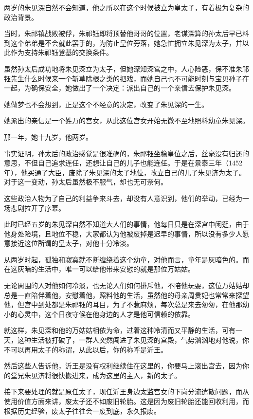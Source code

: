 \begin{multicols}{\theparacolNo}
两岁的朱见深自然不会知道，他之所以在这个时候被立为皇太子，有着极为复杂的政治背景。

当时，朱祁镇战败被俘，朱祁钰即将顶替他哥哥的位置，老谋深算的孙太后早已料到这个弟弟是不会就此罢手的，为防止皇位旁落，她急忙拥立朱见深为太子，并以此作为支持朱祁钰登基的交换条件。

虽然孙太后成功地将朱见深立为太子，但她深知深宫之中，人心险恶，保不准朱祁钰先生什么时候来一个斩草除根之类的把戏，而她自己也不可能时刻与宝贝孙子在一起，为确保安全，她做出了一个决定：派出自己的一个亲信去保护朱见深。

她做梦也不会想到，正是这个不经意的决定，改变了朱见深的一生。

她派出的亲信是一个姓万的宫女，从此这位宫女开始无微不至地照料幼童朱见深。

那一年，她十九岁，他两岁。

事实证明，孙太后的政治感觉是很准确的，朱祁钰坐稳皇位之后，丝毫没有归还的意思，不但自己追求连任，还想让自己的儿子也能连任。于是在景泰三年（1452年），他买通了大臣，废除了朱见深的太子地位，改立自己的儿子朱见济为太子。对于这一变动，孙太后虽然极不服气，却也无可奈何。

这些政治人物为了自己的利益争来斗去，却没有人意识到，他们的举动，已经为一场悲剧拉开了序幕。

此时已经五岁的朱见深自然不知道大人们的事情，他每日只是在深宫中闲逛，由于他身处险境，且地位不稳，大家都认为他被废掉是迟早的事情，所以没有多少人愿意接近这位所谓的皇太子，对他十分冷淡。

从两岁时起，孤独和寂寞就不断缠绕着这个幼童，对他而言，童年是灰暗色的。而在这灰暗的生活中，唯一可以给他带来安慰的就是那位万姑姑。

无论周围的人对他如何冷淡，也无论人们如何排斥他，不陪他玩耍，这位万姑姑却总是一直陪伴着他，安慰着他，照料他的生活，虽然他的母亲周贵妃也常常来探望他，但宫中到处都是朱祁钰的耳目，为了不惹麻烦，每次总是来去匆匆，在他那幼小的心灵中，这个日夜守候在他身边的人才是他可信赖的依靠。

就这样，朱见深和他的万姑姑相依为命，过着这种冷清而又平静的生活，可有一天，这种生活被打破了，一群人突然闯进了朱见深的宫殿，气势汹汹地对他说，你不可以再用太子的称谓，从此以后，你的称呼是沂王。

然后这些人告诉他，沂王是没有权利继续住在这里的，你要马上滚出宫去，因为你的堂兄朱见济将很快搬进来，成为这里的主人，新的太子。

接下来要处理的就是原任太子，现任沂王身边太监宫女的下岗分流遣散问题，而从使用价值方面来讲，废太子还不如废旧轮胎。这是因为废旧轮胎还能回收利用，而根据历史经验，废太子往往会一废到底，永久报废。


\end{multicols}
